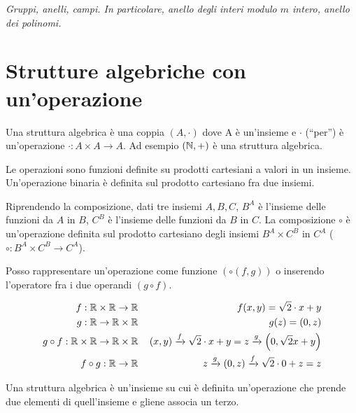 \begin{center}
\indent
\textit{Gruppi, anelli, campi. In particolare, anello degli interi modulo $m$ intero, anello dei polinomi.}
\end{center}

\section{Strutture algebriche con un'operazione}

Una struttura algebrica \`e una coppia $(A, \cdot)$ dove A \`e un'insieme e $\cdot$ (``per'') \`e un'operazione $\cdot : A \times A \to A$. Ad esempio $(\mathbb{N}, +)$ \`e una struttura algebrica.

Le operazioni sono funzioni definite su prodotti cartesiani a valori in un insieme. Un'operazione binaria \`e definita sul prodotto cartesiano fra due insiemi.

Riprendendo la composizione, dati tre insiemi $A, B, C$, $B^A$ \`e l'insieme delle funzioni da $A$ in $B$, $C^B$ \`e l'insieme delle funzioni da $B$ in $C$. La composizione $\circ$ \`e un'operazione definita sul prodotto cartesiano degli insiemi $B^A \times C^B$ in $C^A$ ($\circ : B^A \times C^B \to C^A$).

Posso rappresentare un'operazione come funzione $(\circ \left( f, g \right))$ o inserendo l'operatore fra i due operandi $ (g \circ f) $.
\begin{exmp}
\begin{align*}
f: \mathbb{R} \times \mathbb{R} \to \mathbb{R}  & \, &
f(x,y) = \sqrt{2} \cdot x + y \\
g: \mathbb{R} \to \mathbb{R} \times \mathbb{R}  & \, &
g(z) = (0,z) \\
g \circ f : \mathbb{R} \times \mathbb{R} \to \mathbb{R} \times \mathbb{R} & \, & 
(x,y) \xrightarrow{f} \sqrt{2} \cdot x + y = z \xrightarrow{g} \left( 0, \sqrt{2}x + y \right) \\
f \circ g : \mathbb{R} \to \mathbb{R} & \, &
z \xrightarrow{g} (0,z) \xrightarrow{f} \sqrt{2} \cdot 0 + z = z
\end{align*}
\end{exmp}

Una struttura algebrica \`e un'insieme su cui \`e definita un'operazione che prende due elementi di quell'insieme e gliene associa un terzo.


